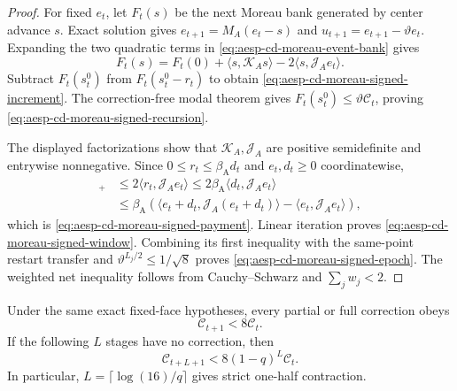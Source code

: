 \begin{proof}
For fixed $e_t$, let $F_t(s)$ be the next Moreau bank generated by center
advance $s$.  Exact solution gives
$e_{t+1}=M_A(e_t-s)$ and $u_{t+1}=e_{t+1}-\vartheta e_t$.
Expanding the two quadratic terms in \cref{eq:aesp-cd-moreau-event-bank}
gives
\begin{equation*}
 F_t(s)=F_t(0)+\langle s,\mathcal K_As\rangle
 -2\langle s,\mathcal J_Ae_t\rangle.
\end{equation*}
Subtract $F_t(s_t^0)$ from $F_t(s_t^0-r_t)$ to obtain
\cref{eq:aesp-cd-moreau-signed-increment}.  The correction-free modal theorem
gives $F_t(s_t^0)\leq\vartheta\mathcal C_t$, proving
\cref{eq:aesp-cd-moreau-signed-recursion}.

The displayed factorizations show that $\mathcal K_A,\mathcal J_A$ are
positive semidefinite and entrywise nonnegative.  Since
$0\leq r_t\leq\beta_{\mathrm A}d_t$ and $e_t,d_t\geq0$ coordinatewise,
\begin{align*}
 [\Xi_t]_+
 &\leq2\langle r_t,\mathcal J_Ae_t\rangle
 \leq2\beta_{\mathrm A}\langle d_t,\mathcal J_Ae_t\rangle\\
 &\leq\beta_{\mathrm A}
 \left(\langle e_t+d_t,\mathcal J_A(e_t+d_t)\rangle
       -\langle e_t,\mathcal J_Ae_t\rangle\right),
\end{align*}
which is \cref{eq:aesp-cd-moreau-signed-payment}.  Linear iteration proves
\cref{eq:aesp-cd-moreau-signed-window}.  Combining its first inequality with
the same-point restart transfer and
$\vartheta^{L_j/2}\leq1/\sqrt8$ proves
\cref{eq:aesp-cd-moreau-signed-epoch}.  The weighted net inequality follows
from Cauchy--Schwarz and $\sum_jw_j<2$.
\end{proof}

\begin{corollary}
\label{cor:aesp-cd-moreau-pulse-reset}
Under the same exact fixed-face hypotheses, every partial or full correction
obeys
\begin{equation*}
 \mathcal C_{t+1}<8\mathcal C_t.
\end{equation*}
If the following $L$ stages have no correction, then
\begin{equation}
 \mathcal C_{t+L+1}<8(1-q)^L\mathcal C_t.
 \label{eq:aesp-cd-moreau-pulse-reset}
\end{equation}
In particular, $L=\lceil\log(16)/q\rceil$ gives strict one-half contraction.
\end{corollary}

